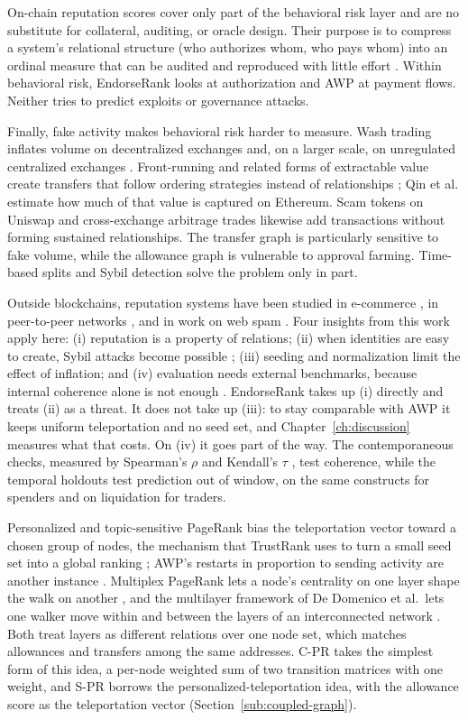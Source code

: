 On-chain reputation scores cover only part of the behavioral risk layer and are no substitute for collateral, auditing, or oracle design. Their purpose is to compress a system's relational structure (who authorizes whom, who pays whom) into an ordinal measure that can be audited and reproduced with little effort . Within behavioral risk, EndorseRank looks at authorization and AWP at payment flows. Neither tries to predict exploits or governance attacks.

Finally, fake activity makes behavioral risk harder to measure. Wash trading inflates volume on decentralized exchanges  and, on a larger scale, on unregulated centralized exchanges . Front-running and related forms of extractable value create transfers that follow ordering strategies instead of relationships ; Qin et al. estimate how much of that value is captured on Ethereum. Scam tokens on Uniswap  and cross-exchange arbitrage trades  likewise add transactions without forming sustained relationships. The transfer graph is particularly sensitive to fake volume, while the allowance graph is vulnerable to approval farming. Time-based splits and Sybil detection solve the problem only in part.


Outside blockchains, reputation systems have been studied in e-commerce , in peer-to-peer networks , and in work on web spam . Four insights from this work apply here: (i) reputation is a property of relations; (ii) when identities are easy to create, Sybil attacks become possible ; (iii) seeding and normalization limit the effect of inflation; and (iv) evaluation needs external benchmarks, because internal coherence alone is not enough . EndorseRank takes up (i) directly and treats (ii) as a threat. It does not take up (iii): to stay comparable with AWP it keeps uniform teleportation and no seed set, and Chapter~\ref{ch:discussion} measures what that costs. On (iv) it goes part of the way. The contemporaneous checks, measured by Spearman's $\rho$  and Kendall's $\tau$ , test coherence, while the temporal holdouts test prediction out of window, on the same constructs for spenders and on liquidation for traders.

Personalized and topic-sensitive PageRank  bias the teleportation vector toward a chosen group of nodes, the mechanism that TrustRank uses to turn a small seed set into a global ranking ; AWP's restarts in proportion to sending activity are another instance . Multiplex PageRank lets a node's centrality on one layer shape the walk on another , and the multilayer framework of De Domenico et al.\ lets one walker move within and between the layers of an interconnected network . Both treat layers as different relations over one node set, which matches allowances and transfers among the same addresses. C-PR takes the simplest form of this idea, a per-node weighted sum of two transition matrices with one weight, and S-PR borrows the personalized-teleportation idea, with the allowance score as the teleportation vector (Section~\ref{sub:coupled-graph}).

